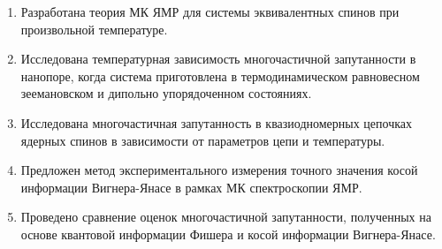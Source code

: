 \begin{enumerate}
  \item
  Разработана теория МК ЯМР для системы эквивалентных спинов при произвольной температуре.

  \item
  Исследована температурная зависимость многочастичной запутанности в нанопоре,
  когда система приготовлена в термодинамическом равновесном зеемановском и дипольно упорядоченном состояниях.

  \item
  Исследована многочастичная запутанность в квазиодномерных цепочках ядерных спинов в зависимости от параметров цепи и температуры.

  \item
  Предложен метод экспериментального измерения точного значения косой информации Вигнера-Янасе в рамках МК спектроскопии ЯМР.

  \item
  Проведено сравнение оценок многочастичной запутанности, полученных на основе квантовой информации Фишера и косой информации Вигнера-Янасе.
\end{enumerate}
